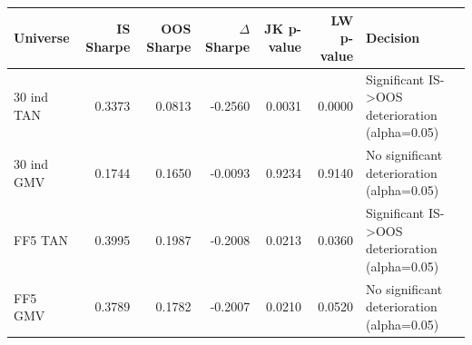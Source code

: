 \begin{tabular}{lrrrrrl}
\toprule
Universe & IS Sharpe & OOS Sharpe & $\Delta$ Sharpe & JK p-value & LW p-value & Decision \\
\midrule
30 ind TAN & 0.3373 & 0.0813 & -0.2560 & 0.0031 & 0.0000 & Significant IS->OOS deterioration (alpha=0.05) \\
30 ind GMV & 0.1744 & 0.1650 & -0.0093 & 0.9234 & 0.9140 & No significant deterioration (alpha=0.05) \\
FF5 TAN & 0.3995 & 0.1987 & -0.2008 & 0.0213 & 0.0360 & Significant IS->OOS deterioration (alpha=0.05) \\
FF5 GMV & 0.3789 & 0.1782 & -0.2007 & 0.0210 & 0.0520 & No significant deterioration (alpha=0.05) \\
\bottomrule
\end{tabular}
